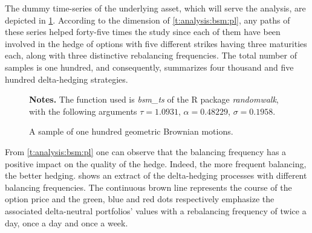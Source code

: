 \documentclass[12pt,a4paper]{report}
\begin{document}
The dummy time-series of the underlying asset, which will serve the analysis, are depicted in \cref{p:analysis:gbm:100}. 
According to the dimension of \cref{t:analysis:bsm:pl}, any paths of these series helped forty-five times the study since each of them have been involved in the hedge of options with five different strikes having three maturities each, along with three distinctive rebalancing frequencies.
The total number of samples is one hundred, and consequently,  summarizes four thousand and five hundred delta-hedging strategies.

\begin{figure}[ht]
  \centering
  
  \caption{A sample of one hundred geometric Brownian motions.}
  \begin{changemargin}{0.5cm}{0.5cm}
  \medskip
\footnotesize
{}\textbf{Notes.} The function used is \textit{bsm\_ts} of the R package \textit{randomwalk}, with the following arguments $\tau = 1.0931$, $\alpha = 0.48229$, $\sigma = 0.1958$.
  \end{changemargin}
  \label{p:analysis:gbm:100}
\end{figure}



























From \cref{t:analysis:bsm:pl} one can observe that the balancing frequency has a positive impact on the quality of the hedge.
Indeed, the more frequent balancing, the better hedging.
 shows an extract of the delta-hedging processes with different balancing frequencies.
The continuous brown line represents the course of the option price and the green, blue and red dots respectively emphasize the associated delta-neutral portfolios' values with a rebalancing frequency of twice a day, once a day and once a week.
\end{document}
